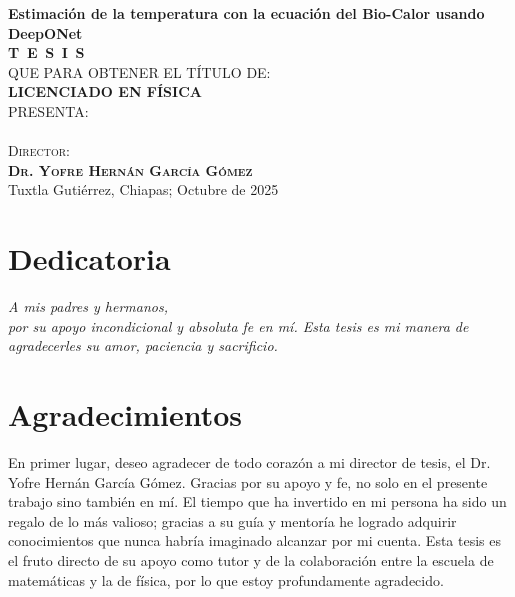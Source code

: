 \documentclass[
  spanish,
  us-letterpaper,
]{scrreprt}
\theoremstyle{definition}
\theoremstyle{plain}
\theoremstyle{remark}
\begin{document}
\begin{titlepage}
\begin{minipage}[t][0.95\textheight][c]{0.76\textwidth}
            \begin{center}
                {\Large\bfseries Estimación de la temperatura con la ecuación del Bio-Calor usando DeepONet}\\[2cm]
                \textsc{\huge \textbf{T\, E\, S\, I\, S}}\\[1.5cm]
                \textsc{\large QUE PARA OBTENER EL TÍTULO DE:}\\[0.3cm]
                \textbf{\textsc{LICENCIADO EN FÍSICA}}\\[1.5cm]
                \textsc{\large PRESENTA:}\\[0.3cm]
                \\[0.9cm]
                {\large\scshape Director:\\[0.3cm]
                {\textbf{\large Dr. Yofre Hernán García Gómez }}}\\[2.0cm]
                \large{Tuxtla Gutiérrez, Chiapas; Octubre de 2025}

            \end{center}
\end{minipage}
\end{titlepage}

\pagebreak[2]

\chapter*{Dedicatoria}
\begin{flushright}
\textit{A mis padres y hermanos, \\ por su apoyo incondicional y absoluta fe en mí. Esta tesis es mi manera de agradecerles su amor, paciencia y sacrificio.}
\end{flushright}

\chapter*{Agradecimientos}
En primer lugar, deseo agradecer de todo corazón a mi director de tesis, el Dr. Yofre Hernán García Gómez. Gracias por su apoyo y fe, no solo en el presente trabajo sino también en mí. El tiempo que ha invertido en mi persona ha sido un regalo de lo más valioso; gracias a su guía y mentoría he logrado adquirir conocimientos que nunca habría imaginado alcanzar por mi cuenta. Esta tesis es el fruto directo de su apoyo como tutor y de la colaboración entre la escuela de matemáticas y la de física, por lo que estoy profundamente agradecido.
\end{document}
